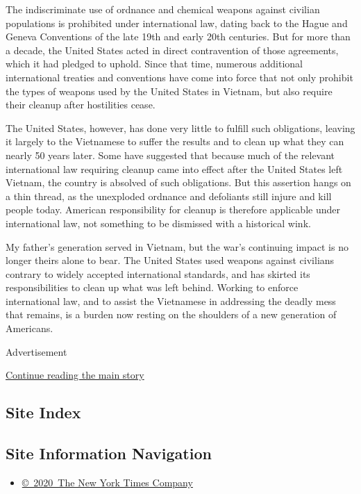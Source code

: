 The indiscriminate use of ordnance and chemical weapons against civilian
populations is prohibited under international law, dating back to the
Hague and Geneva Conventions of the late 19th and early 20th centuries.
But for more than a decade, the United States acted in direct
contravention of those agreements, which it had pledged to uphold. Since
that time, numerous additional international treaties and conventions
have come into force that not only prohibit the types of weapons used by
the United States in Vietnam, but also require their cleanup after
hostilities cease.

The United States, however, has done very little to fulfill such
obligations, leaving it largely to the Vietnamese to suffer the results
and to clean up what they can nearly 50 years later. Some have suggested
that because much of the relevant international law requiring cleanup
came into effect after the United States left Vietnam, the country is
absolved of such obligations. But this assertion hangs on a thin thread,
as the unexploded ordnance and defoliants still injure and kill people
today. American responsibility for cleanup is therefore applicable under
international law, not something to be dismissed with a historical wink.

My father's generation served in Vietnam, but the war's continuing
impact is no longer theirs alone to bear. The United States used weapons
against civilians contrary to widely accepted international standards,
and has skirted its responsibilities to clean up what was left behind.
Working to enforce international law, and to assist the Vietnamese in
addressing the deadly mess that remains, is a burden now resting on the
shoulders of a new generation of Americans.

Advertisement

\protect\hyperlink{after-bottom}{Continue reading the main story}

\hypertarget{site-index}{%
\subsection{Site Index}\label{site-index}}

\hypertarget{site-information-navigation}{%
\subsection{Site Information
Navigation}\label{site-information-navigation}}

\begin{itemize}
\tightlist
\item
  \href{https://help.nytimes.com/hc/en-us/articles/115014792127-Copyright-notice}{©~2020~The
  New York Times Company}
\end{itemize}

